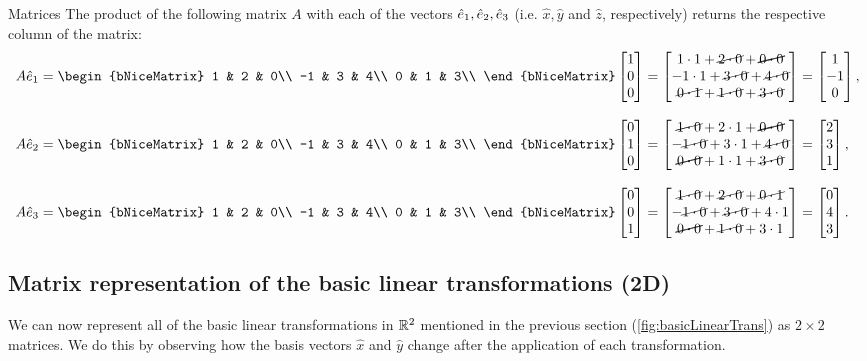 \begin{example}{Matrices}{}
	The product of the following matrix $A$ with each of the vectors $\hat{e}_{1},\hat{e}_{2},\hat{e}_{3}$ (i.e. $\hat{x},\hat{y}$ and $\hat{z}$, respectively) returns the respective column of the matrix:
	\begin{align*}
		A\eb{1}=
		\begin{bNiceMatrix}
			 1 & 2 & 0\\
			-1 & 3 & 4\\
			 0 & 1 & 3\\
		 \end{bNiceMatrix}\colvec{1;0;0} &= \colvec{1\cdot1+\cancel{2\cdot0}+\cancel{\cancel{0\cdot0}};-1\cdot1+\cancel{3\cdot0}+\cancel{4\cdot0};\cancel{0\cdot1}+\cancel{1\cdot0}+\cancel{3\cdot0}} = \colvec{1;-1;0},\\[3mm]
		A\eb{2}=
		\begin{bNiceMatrix}
			 1 & 2 & 0\\
			-1 & 3 & 4\\
			 0 & 1 & 3\\
		\end{bNiceMatrix}\colvec{0;1;0} &= \colvec{\cancel{1\cdot0}+2\cdot1+\cancel{\cancel{0\cdot0}};-\cancel{1\cdot0}+3\cdot1+\cancel{4\cdot0};\cancel{\cancel{0\cdot0}}+1\cdot1+\cancel{3\cdot0}} = \colvec{2;3;1},\\[3mm]
		A\eb{3}=
		\begin{bNiceMatrix}
			 1 & 2 & 0\\
			-1 & 3 & 4\\
			 0 & 1 & 3\\
		\end{bNiceMatrix}\colvec{0;0;1} &= \colvec{\cancel{1\cdot0}+\cancel{2\cdot0}+\cancel{0\cdot1};-\cancel{1\cdot0}+\cancel{3\cdot0}+4\cdot1;\cancel{\cancel{0\cdot0}}+\cancel{1\cdot0}+3\cdot1} = \colvec{0;4;3}.
	\end{align*}
\end{example}

\subsection{Matrix representation of the basic linear transformations (2D)}
We can now represent all of the basic linear transformations in $\mathbb{R}^{2}$ mentioned in the previous section (\autoref{fig:basicLinearTrans}) as $2\times2$ matrices. We do this by observing how the basis vectors $\hat{x}$ and $\hat{y}$ change after the application of each transformation.

